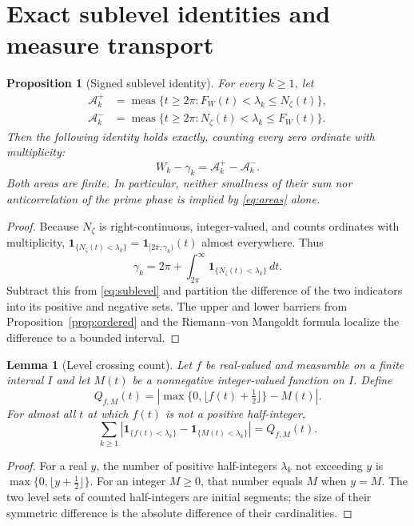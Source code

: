 \documentclass[11pt,leqno]{amsart}
\numberwithin{equation}{section}
\newtheorem{proposition}[theorem]{Proposition}
\newtheorem{lemma}[theorem]{Lemma}
\theoremstyle{definition}
\theoremstyle{remark}
\newcommand{\1}{\mathbf 1}
\newcommand{\meas}{\operatorname{meas}}
\newcommand{\floor}[1]{\lfloor #1\rfloor}
\begin{document}
\section{Exact sublevel identities and measure transport}\label{sec:transport}
\begin{proposition}[Signed sublevel identity]\label{prop:exact-areas}
For every $k\ge1$, let
\begin{align}
 \mathcal A_k^+&=\meas\{t\ge2\pi:F_W(t)<\lambda_k\le N_\zeta(t)\},\label{eq:Aplus}\\
 \mathcal A_k^-&=\meas\{t\ge2\pi:N_\zeta(t)<\lambda_k\le F_W(t)\}.\label{eq:Aminus}
\end{align}
Then the following identity holds exactly, counting every zero ordinate with multiplicity:
\begin{equation}\label{eq:areas}
 \boxed{W_k-\gamma_k=\mathcal A_k^+-\mathcal A_k^-.}
\end{equation}
Both areas are finite. In particular, neither smallness of their sum nor anticorrelation of the prime phase is implied by \eqref{eq:areas} alone.
\end{proposition}
\begin{proof}
Because $N_\zeta$ is right-continuous, integer-valued, and counts ordinates with multiplicity, $\1_{\{N_\zeta(t)<\lambda_k\}}=\1_{[2\pi,\gamma_k)}(t)$ almost everywhere. Thus
\[
 \gamma_k=2\pi+\int_{2\pi}^\infty\1_{\{N_\zeta(t)<\lambda_k\}}\,dt.
\]
Subtract this from \eqref{eq:sublevel} and partition the difference of the two indicators into its positive and negative sets. The upper and lower barriers from Proposition~\ref{prop:ordered} and the Riemann--von Mangoldt formula localize the difference to a bounded interval.
\end{proof}
\begin{lemma}[Level crossing count]\label{lem:crossing}
Let $f$ be real-valued and measurable on a finite interval $I$ and let $M(t)$ be a nonnegative integer-valued function on $I$. Define
\begin{equation}\label{eq:cross-q}
 Q_{f,M}(t)=\left|\max\{0,\floor{f(t)+\tfrac12}\}-M(t)\right|.
\end{equation}
For almost all $t$ at which $f(t)$ is not a positive half-integer,
\begin{equation}\label{eq:cross-identity}
 \sum_{k\ge1}\left|\1_{\{f(t)<\lambda_k\}}-\1_{\{M(t)<\lambda_k\}}\right|=Q_{f,M}(t).
\end{equation}
\end{lemma}
\begin{proof}
For a real $y$, the number of positive half-integers $\lambda_k$ not exceeding $y$ is $\max\{0,\floor{y+\frac12}\}$. For an integer $M\ge0$, that number equals $M$ when $y=M$. The two level sets of counted half-integers are initial segments; the size of their symmetric difference is the absolute difference of their cardinalities.
\end{proof}
\end{document}
